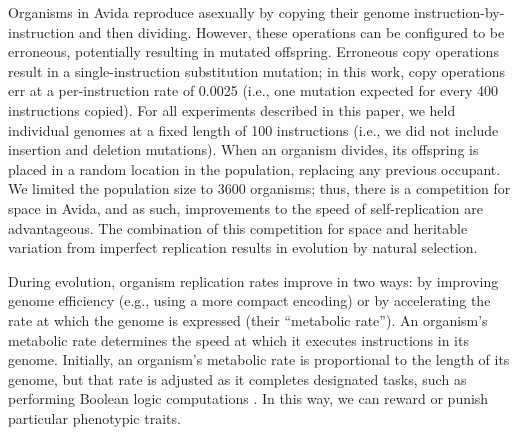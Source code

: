 Organisms in Avida reproduce asexually by copying their genome instruction-by-instruction and then dividing. 
However, these operations can be configured to be erroneous, potentially resulting in mutated offspring.
Erroneous copy operations result in a single-instruction substitution mutation; in this work, copy operations err at a per-instruction rate of 0.0025 (i.e., one mutation expected for every 400 instructions copied).
For all experiments described in this paper, we held individual genomes at a fixed length of 100 instructions (i.e., we did not include insertion and deletion mutations).
When an organism divides, its offspring is placed in a random location in the population, replacing any previous occupant.
We limited the population size to 3600 organisms; thus, there is a competition for space in Avida, and as such, improvements to the speed of self-replication are advantageous.
The combination of this competition for space and heritable variation from imperfect replication results in evolution by natural selection.

During evolution, organism replication rates improve in two ways: by improving genome efficiency (e.g., using a more compact encoding) or by accelerating the rate at which the genome is expressed (their ``metabolic rate'').
An organism's metabolic rate determines the speed at which it executes instructions in its genome.
Initially, an organism's metabolic rate is proportional to the length of its genome, but that rate is adjusted as it completes designated tasks, such as performing Boolean logic computations \citep{ofria_avida:_2009}.
In this way, we can reward or punish particular phenotypic traits. 


